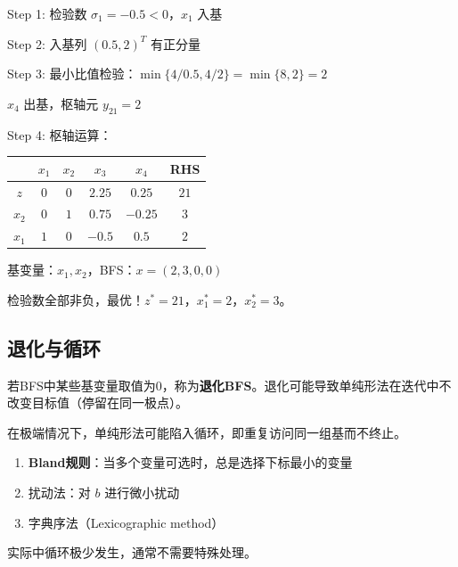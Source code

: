 \begin{example}[单纯形法完整求解]
Step 1: 检验数 $\sigma_1 = -0.5 < 0$，$x_1$ 入基

Step 2: 入基列 $(0.5, 2)^T$ 有正分量

Step 3: 最小比值检验：$\min\{4/0.5, 4/2\} = \min\{8, 2\} = 2$

$x_4$ 出基，枢轴元 $y_{21} = 2$

Step 4: 枢轴运算：

\begin{table}[H]
\centering
\begin{tabular}{@{}c|cccc|c@{}}
\toprule
& $x_1$ & $x_2$ & $x_3$ & $x_4$ & RHS \\
\midrule
$z$ & $0$ & $0$ & $2.25$ & $0.25$ & $21$ \\
\midrule
$x_2$ & $0$ & $1$ & $0.75$ & $-0.25$ & $3$ \\
$x_1$ & $1$ & $0$ & $-0.5$ & $0.5$ & $2$ \\
\bottomrule
\end{tabular}
\end{table}

基变量：$x_1, x_2$，BFS：$x = (2, 3, 0, 0)$

检验数全部非负，最优！$z^* = 21$，$x_1^* = 2$，$x_2^* = 3$。
\end{example}

\subsection{退化与循环}

\begin{definition}[退化]
若BFS中某些基变量取值为0，称为\textbf{退化BFS}。退化可能导致单纯形法在迭代中不改变目标值（停留在同一极点）。
\end{definition}

\begin{definition}[循环（Cycling）]
在极端情况下，单纯形法可能陷入循环，即重复访问同一组基而不终止。
\end{definition}

\begin{notebox}[避免循环的方法]
\begin{enumerate}
    \item \textbf{Bland规则}：当多个变量可选时，总是选择下标最小的变量
    \item 扰动法：对 $b$ 进行微小扰动
    \item 字典序法（Lexicographic method）
\end{enumerate}
实际中循环极少发生，通常不需要特殊处理。
\end{notebox}

